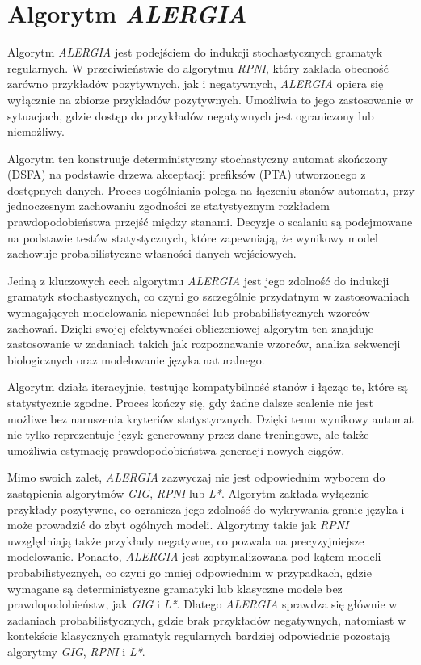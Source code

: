 \section{Algorytm \textit{ALERGIA}}  
\label{sec:alergia}  

Algorytm \textit{ALERGIA} \cite{ALERGIA} jest podejściem do indukcji stochastycznych gramatyk regularnych. W przeciwieństwie do algorytmu \textit{RPNI}, który zakłada obecność zarówno przykładów pozytywnych, jak i negatywnych, \textit{ALERGIA} opiera się wyłącznie na zbiorze przykładów pozytywnych. Umożliwia to jego zastosowanie w sytuacjach, gdzie dostęp do przykładów negatywnych jest ograniczony lub niemożliwy.  

Algorytm ten konstruuje deterministyczny stochastyczny automat skończony (DSFA) na podstawie drzewa akceptacji prefiksów (PTA) utworzonego z dostępnych danych. Proces uogólniania polega na łączeniu stanów automatu, przy jednoczesnym zachowaniu zgodności ze statystycznym rozkładem prawdopodobieństwa przejść między stanami. Decyzje o scalaniu są podejmowane na podstawie testów statystycznych, które zapewniają, że wynikowy model zachowuje probabilistyczne własności danych wejściowych.  

Jedną z kluczowych cech algorytmu \textit{ALERGIA} jest jego zdolność do indukcji gramatyk stochastycznych, co czyni go szczególnie przydatnym w zastosowaniach wymagających modelowania niepewności lub probabilistycznych wzorców zachowań. Dzięki swojej efektywności obliczeniowej algorytm ten znajduje zastosowanie w zadaniach takich jak rozpoznawanie wzorców, analiza sekwencji biologicznych oraz modelowanie języka naturalnego.

Algorytm działa iteracyjnie, testując kompatybilność stanów i łącząc te, które są statystycznie zgodne. Proces kończy się, gdy żadne dalsze scalenie nie jest możliwe bez naruszenia kryteriów statystycznych. Dzięki temu wynikowy automat nie tylko reprezentuje język generowany przez dane treningowe, ale także umożliwia estymację prawdopodobieństwa generacji nowych ciągów.

Mimo swoich zalet, \textit{ALERGIA} zazwyczaj nie jest odpowiednim wyborem do zastąpienia algorytmów \textit{GIG}, \textit{RPNI} lub \textit{L*}. Algorytm zakłada wyłącznie przykłady pozytywne, co ogranicza jego zdolność do wykrywania granic języka i może prowadzić do zbyt ogólnych modeli. Algorytmy takie jak \textit{RPNI} uwzględniają także przykłady negatywne, co pozwala na precyzyjniejsze modelowanie. Ponadto, \textit{ALERGIA} jest zoptymalizowana pod kątem modeli probabilistycznych, co czyni go mniej odpowiednim w przypadkach, gdzie wymagane są deterministyczne gramatyki lub klasyczne modele bez prawdopodobieństw, jak \textit{GIG} i \textit{L*}. Dlatego \textit{ALERGIA} sprawdza się głównie w zadaniach probabilistycznych, gdzie brak przykładów negatywnych, natomiast w kontekście klasycznych gramatyk regularnych bardziej odpowiednie pozostają algorytmy \textit{GIG}, \textit{RPNI} i \textit{L*}.

